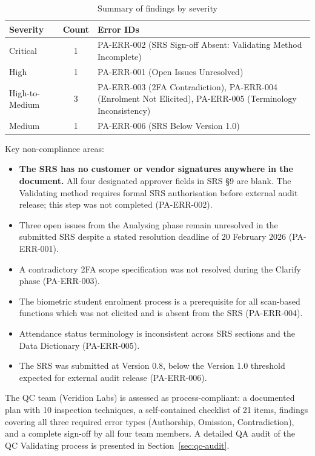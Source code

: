 \documentclass[11pt,a4paper]{article}
\begin{document}
\begin{table}[H]
\centering\small
\begin{tabular}{|l|c|>{\RaggedRight\arraybackslash}m{8cm}|}
\hline
\rowcolor{tableheader}
\textbf{Severity} & \textbf{Count} & \textbf{Error IDs} \\\hline
Critical        & 1 & PA-ERR-002 (SRS Sign-off Absent: Validating Method Incomplete) \\\hline
High            & 1 & PA-ERR-001 (Open Issues Unresolved) \\\hline
High-to-Medium  & 3 & PA-ERR-003 (2FA Contradiction), PA-ERR-004 (Enrolment Not Elicited), PA-ERR-005 (Terminology Inconsistency) \\\hline
Medium          & 1 & PA-ERR-006 (SRS Below Version 1.0) \\\hline
\end{tabular}
\caption{Summary of findings by severity}
\end{table}

Key non-compliance areas:

\begin{itemize}
    \item \textbf{The SRS has no customer or vendor signatures anywhere in the document.} All four designated approver fields in SRS \S9 are blank. The Validating method requires formal SRS authorisation before external audit release; this step was not completed (PA-ERR-002).
    \item Three open issues from the Analysing phase remain unresolved in the submitted SRS despite a stated resolution deadline of 20 February 2026 (PA-ERR-001).
    \item A contradictory 2FA scope specification was not resolved during the Clarify phase (PA-ERR-003).
    \item The biometric student enrolment process is a prerequisite for all scan-based functions which was not elicited and is absent from the SRS (PA-ERR-004).
    \item Attendance status terminology is inconsistent across SRS sections and the Data Dictionary (PA-ERR-005).
    \item The SRS was submitted at Version 0.8, below the Version 1.0 threshold expected for external audit release (PA-ERR-006).
\end{itemize}

The QC team (Veridion Labs) is assessed as process-compliant: a documented plan with 10 inspection techniques, a self-contained checklist of 21 items, findings covering all three required error types (Authorship, Omission, Contradiction), and a complete sign-off by all four team members. A detailed QA audit of the QC Validating process is presented in Section~\ref{sec:qc-audit}.
\end{document}
